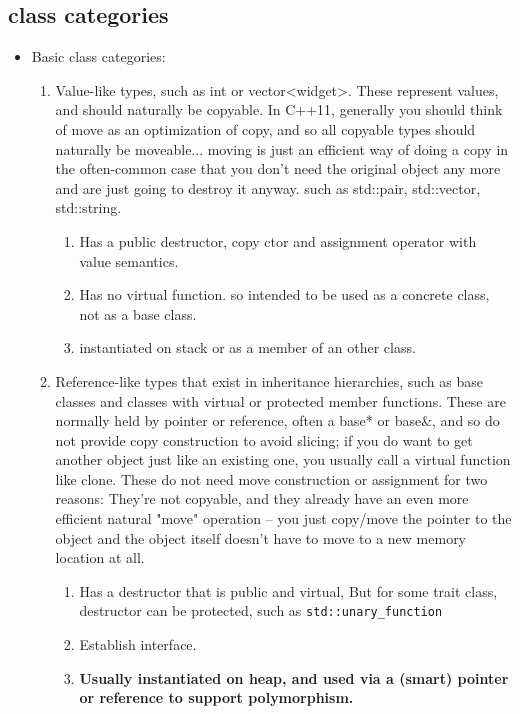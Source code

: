 \documentclass[a4paper,11pt,twoside]{book}
\begin{document}
\subsection{class categories}
\begin{itemize}
	\item Basic class categories:
	\begin{enumerate}
 
			
		\item Value-like types, such as int or vector<widget>. These represent values, and should naturally be copyable. In C++11, generally you should think of move as an optimization of copy, and so all copyable types should naturally be moveable... moving is just an efficient way of doing a copy in the often-common case that you don't need the original object any more and are just going to destroy it anyway. such as std::pair, std::vector, std::string.
		
		\begin{enumerate}
			\item Has a public destructor, copy ctor and assignment operator with value semantics.
			\item Has no virtual function. so intended to be used as a concrete class, not as a base class.
			\item instantiated on stack or as a member of an other class.
		\end{enumerate}
		
		\item Reference-like types that exist in inheritance hierarchies, such as base classes and classes with virtual or protected member functions. These are normally held by pointer or reference, often a base* or base\&, and so do not provide copy construction to avoid slicing; if you do want to get another object just like an existing one, you usually call a virtual function like clone. These do not need move construction or assignment for two reasons: They're not copyable, and they already have an even more efficient natural "move" operation -- you just copy/move the pointer to the object and the object itself doesn't have to move to a new memory location at all.
		\begin{enumerate}
			\item Has a destructor that is public and virtual, But for some trait class, destructor can be protected, such as \texttt{std::unary\_function}
			\item Establish interface.
			\item \textbf{Usually instantiated on heap, and used via a (smart) pointer or reference to support polymorphism.}
		\end{enumerate}
		

\end{enumerate}
\end{itemize}
\end{document}
